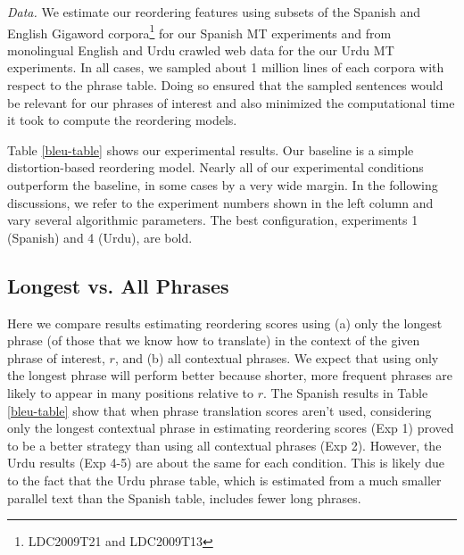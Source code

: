 \documentclass[11pt,letterpaper]{article}
\newcommand{\todo}[1]{\textcolor{red}{TODO: #1}}
\newcommand{\paraheader}[1]{\vskip 0.05in \noindent\emph{#1}}
\begin{document}
\begin{table}[t]
\begin{smaller}
\vskip -0.15in
\end{smaller}
\end{table}


\paraheader{Data.} We estimate our reordering features using subsets of the Spanish and English Gigaword corpora\footnote{LDC2009T21 and LDC2009T13} for our Spanish MT experiments and from monolingual English and Urdu crawled web data for the our Urdu MT experiments. In all cases, we sampled about 1 million lines of each corpora with respect to the phrase table. Doing so ensured that the sampled sentences would be relevant for our phrases of interest and also minimized the computational time it took to compute the reordering models.


Table \ref{bleu-table} shows our experimental results. Our baseline is a simple distortion-based reordering model. Nearly all of our experimental conditions outperform the baseline, in some cases by a very wide margin. In the following discussions, we refer to the experiment numbers shown in the left column and vary several algorithmic parameters. The best configuration, experiments 1 (Spanish) and 4 (Urdu), are bold. %

\subsection{Longest vs. All Phrases}
Here we compare results estimating reordering scores using (a) only the longest phrase (of those that we know how to translate) in the context of the given phrase of interest, $r$, and (b) all contextual phrases. We expect that using only the longest phrase will perform better because shorter, more frequent phrases are likely to appear in many positions relative to $r$. The Spanish results in Table \ref{bleu-table} show that when phrase translation scores aren't used, considering only the longest contextual phrase in estimating reordering scores (Exp 1) proved to be a better strategy than using all contextual phrases (Exp 2). However, the Urdu results (Exp 4-5) are about the same for each condition. This is likely due to the fact that the Urdu phrase table, which is estimated from a much smaller parallel text than the Spanish table, includes fewer long phrases.
\end{document}
